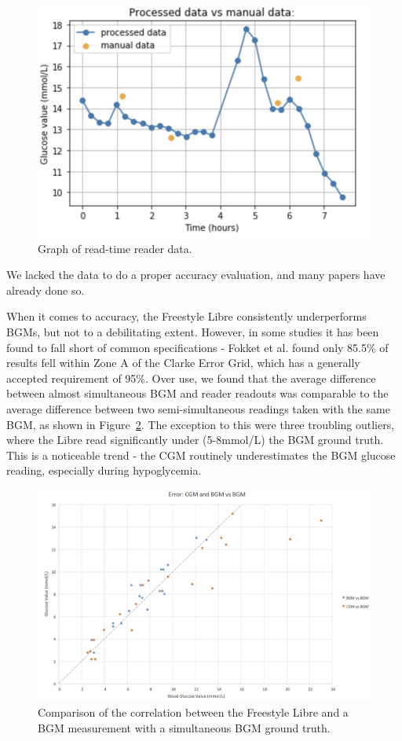 \begin{figure}[ht]
\centering\includegraphics[width=0.7\linewidth]{images/graph4.png}
\caption{Graph of read-time reader data.}
\label{fig:graph4}
\end{figure}

We lacked the data to do a proper accuracy evaluation, and many papers have already done so. 

When it comes to accuracy, the Freestyle Libre consistently underperforms BGMs, but not to a debilitating extent. However, in some studies it has been found to fall short of common specifications - Fokket et al. found only 85.5\% of results fell within Zone A of the Clarke Error Grid, which has a generally accepted requirement of 95\%. Over use, we found that the average difference between almost simultaneous BGM and reader readouts was comparable to the average difference between two semi-simultaneous readings taken with the same BGM, as shown in Figure~\ref{fig:cgmvsbgm}. The exception to this were three troubling outliers, where the Libre read significantly under (5-8mmol/L) the BGM ground truth. This is a noticeable trend - the CGM routinely underestimates the BGM glucose reading, especially during hypoglycemia. 

\begin{figure}[ht]
\centering\includegraphics[width=1\linewidth]{images/cgmvsbgm.png}
\caption{Comparison of the correlation between the Freestyle Libre and a BGM measurement with a simultaneous BGM ground truth.}
\label{fig:cgmvsbgm}
\end{figure}

